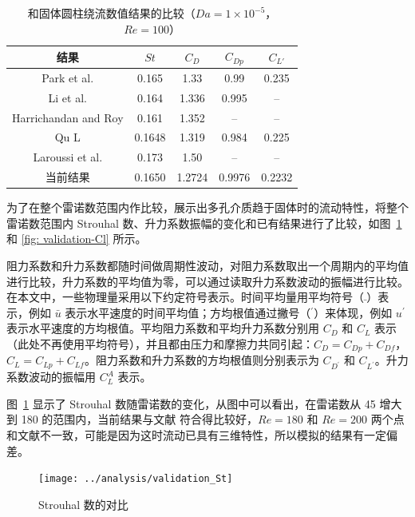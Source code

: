 \begin{table}[ht]
	\caption{和固体圆柱绕流数值结果的比较（$Da=1\times 10^{-5}$，$Re=100$）}
	\label{tab: validation}
	\vspace{.5em}\centering\wuhao
	\begin{tabular}{*{5}{c}}
		\toprule[1.5pt]
		结果 & $St$ & $C_D$ & $C_{Dp}$ & $C_{L'}$ \\
		\midrule[1pt]
		Park et al. \inlinecite{Park1998} & 0.165 & 1.33 & 0.99 & 0.235 \\
		Li et al. \inlinecite{Li2009} & 0.164 & 1.336 & 0.995 & -- \\
		Harrichandan and Roy \inlinecite{Harichandan2010} & 0.161 & 1.352 & -- & -- \\
		Qu L \inlinecite{Qu2013} & 0.1648 & 1.319 & 0.984 & 0.225 \\
		Laroussi et al. \inlinecite{Laroussi2014} & 0.173 & 1.50 & -- & -- \\
		当前结果 & 0.1650 & 1.2724 & 0.9976 & 0.2232 \\
		\bottomrule[1.5pt]
	\end{tabular}
\end{table}

为了在整个雷诺数范围内作比较，展示出多孔介质趋于固体时的流动特性，将整个雷诺数范围内 Strouhal 数、升力系数振幅的变化和已有结果进行了比较，如图~\ref{fig: validation-St} 和 \ref{fig: validation-Cl} 所示。%

阻力系数和升力系数都随时间做周期性波动，对阻力系数取出一个周期内的平均值进行比较，升力系数的平均值为零，可以通过读取升力系数波动的振幅进行比较。在本文中，一些物理量采用以下约定符号表示。时间平均量用平均符号（$\bar{ }$）表示，例如 $\bar u$ 表示水平速度的时间平均值；方均根值通过撇号（$^\prime$）来体现，例如 $u^\prime$ 表示水平速度的方均根值。平均阻力系数和平均升力系数分别用 $C_D$ 和 $C_L$ 表示（此处不再使用平均符号），并且都由压力和摩擦力共同引起：$C_D=C_{Dp}+C_{Df}$，$C_L=C_{Lp}+C_{Lf}$。阻力系数和升力系数的方均根值则分别表示为 $C_{D^\prime}$ 和 $C_{L^\prime}$。升力系数波动的振幅用 $C_L^A$ 表示。

图~\ref{fig: validation-St} 显示了 Strouhal 数随雷诺数的变化，从图中可以看出，在雷诺数从 45 增大到 180 的范围内，当前结果与文献  符合得比较好，$Re=180$ 和 $Re=200$ 两个点和文献不一致，可能是因为这时流动已具有三维特性，所以模拟的结果有一定偏差。

\begin{figure}
	\centering
	\texttt{[image: ../analysis/validation\_St]}
	\caption{Strouhal 数的对比}
	\label{fig: validation-St}
\end{figure}

